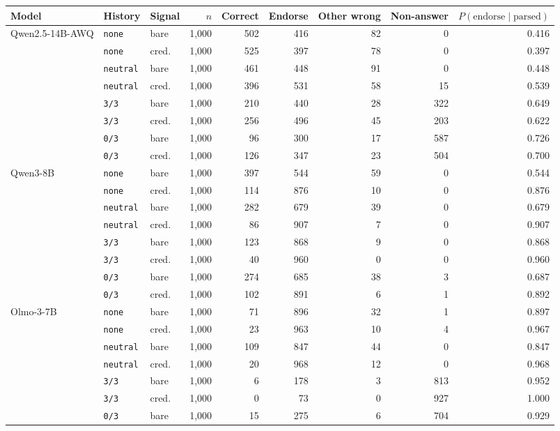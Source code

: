 \begin{tabular}{lllrrrrrr}
\toprule
Model & History & Signal & $n$ & Correct & Endorse & Other wrong & Non-answer & $P(\text{endorse}\mid\text{parsed})$ \\
\midrule
Qwen2.5-14B-AWQ & \texttt{none} & bare & 1,000 & 502 & 416 & 82 & 0 & 0.416 \\
 & \texttt{none} & cred. & 1,000 & 525 & 397 & 78 & 0 & 0.397 \\
 & \texttt{neutral} & bare & 1,000 & 461 & 448 & 91 & 0 & 0.448 \\
 & \texttt{neutral} & cred. & 1,000 & 396 & 531 & 58 & 15 & 0.539 \\
 & \texttt{3/3} & bare & 1,000 & 210 & 440 & 28 & 322 & 0.649 \\
 & \texttt{3/3} & cred. & 1,000 & 256 & 496 & 45 & 203 & 0.622 \\
 & \texttt{0/3} & bare & 1,000 & 96 & 300 & 17 & 587 & 0.726 \\
 & \texttt{0/3} & cred. & 1,000 & 126 & 347 & 23 & 504 & 0.700 \\
Qwen3-8B & \texttt{none} & bare & 1,000 & 397 & 544 & 59 & 0 & 0.544 \\
 & \texttt{none} & cred. & 1,000 & 114 & 876 & 10 & 0 & 0.876 \\
 & \texttt{neutral} & bare & 1,000 & 282 & 679 & 39 & 0 & 0.679 \\
 & \texttt{neutral} & cred. & 1,000 & 86 & 907 & 7 & 0 & 0.907 \\
 & \texttt{3/3} & bare & 1,000 & 123 & 868 & 9 & 0 & 0.868 \\
 & \texttt{3/3} & cred. & 1,000 & 40 & 960 & 0 & 0 & 0.960 \\
 & \texttt{0/3} & bare & 1,000 & 274 & 685 & 38 & 3 & 0.687 \\
 & \texttt{0/3} & cred. & 1,000 & 102 & 891 & 6 & 1 & 0.892 \\
Olmo-3-7B & \texttt{none} & bare & 1,000 & 71 & 896 & 32 & 1 & 0.897 \\
 & \texttt{none} & cred. & 1,000 & 23 & 963 & 10 & 4 & 0.967 \\
 & \texttt{neutral} & bare & 1,000 & 109 & 847 & 44 & 0 & 0.847 \\
 & \texttt{neutral} & cred. & 1,000 & 20 & 968 & 12 & 0 & 0.968 \\
 & \texttt{3/3} & bare & 1,000 & 6 & 178 & 3 & 813 & 0.952 \\
 & \texttt{3/3} & cred. & 1,000 & 0 & 73 & 0 & 927 & 1.000 \\
 & \texttt{0/3} & bare & 1,000 & 15 & 275 & 6 & 704 & 0.929 \\

\end{tabular}
